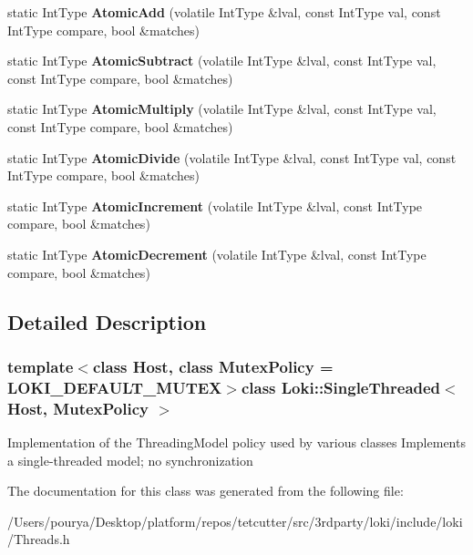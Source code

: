 \begin{DoxyCompactItemize}
\item 
\hypertarget{classLoki_1_1SingleThreaded_a73318d715e9b5c3aa2c26238b013dfeb}{}static Int\+Type {\bfseries Atomic\+Add} (volatile Int\+Type \&lval, const Int\+Type val, const Int\+Type compare, bool \&matches)\label{classLoki_1_1SingleThreaded_a73318d715e9b5c3aa2c26238b013dfeb}

\item 
\hypertarget{classLoki_1_1SingleThreaded_a4a1dc38ce4e8130ea548d5b293954415}{}static Int\+Type {\bfseries Atomic\+Subtract} (volatile Int\+Type \&lval, const Int\+Type val, const Int\+Type compare, bool \&matches)\label{classLoki_1_1SingleThreaded_a4a1dc38ce4e8130ea548d5b293954415}

\item 
\hypertarget{classLoki_1_1SingleThreaded_a00c1870b9e9f0de7f391e87daa0b3389}{}static Int\+Type {\bfseries Atomic\+Multiply} (volatile Int\+Type \&lval, const Int\+Type val, const Int\+Type compare, bool \&matches)\label{classLoki_1_1SingleThreaded_a00c1870b9e9f0de7f391e87daa0b3389}

\item 
\hypertarget{classLoki_1_1SingleThreaded_aea3406121e22748acc5d40e735e6e7e1}{}static Int\+Type {\bfseries Atomic\+Divide} (volatile Int\+Type \&lval, const Int\+Type val, const Int\+Type compare, bool \&matches)\label{classLoki_1_1SingleThreaded_aea3406121e22748acc5d40e735e6e7e1}

\item 
\hypertarget{classLoki_1_1SingleThreaded_a0245d92fa59cf7d63116488abccf1ac4}{}static Int\+Type {\bfseries Atomic\+Increment} (volatile Int\+Type \&lval, const Int\+Type compare, bool \&matches)\label{classLoki_1_1SingleThreaded_a0245d92fa59cf7d63116488abccf1ac4}

\item 
\hypertarget{classLoki_1_1SingleThreaded_a296636079dbf89f358bf70fccad152f7}{}static Int\+Type {\bfseries Atomic\+Decrement} (volatile Int\+Type \&lval, const Int\+Type compare, bool \&matches)\label{classLoki_1_1SingleThreaded_a296636079dbf89f358bf70fccad152f7}

\end{DoxyCompactItemize}


\subsection{Detailed Description}
\subsubsection*{template$<$class Host, class Mutex\+Policy = L\+O\+K\+I\+\_\+\+D\+E\+F\+A\+U\+L\+T\+\_\+\+M\+U\+T\+E\+X$>$class Loki\+::\+Single\+Threaded$<$ Host, Mutex\+Policy $>$}

Implementation of the Threading\+Model policy used by various classes Implements a single-\/threaded model; no synchronization 

The documentation for this class was generated from the following file\+:\begin{DoxyCompactItemize}
\item 
/\+Users/pourya/\+Desktop/platform/repos/tetcutter/src/3rdparty/loki/include/loki/Threads.\+h\end{DoxyCompactItemize}
